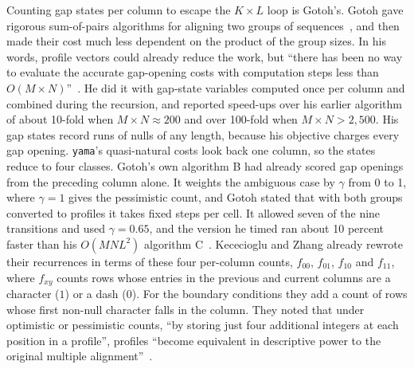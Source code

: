 \documentclass[11pt,letterpaper]{article}
\newcommand{\code}[1]{\texttt{#1}}
\begin{document}
Counting gap states per column to escape the $K \times L$ loop is Gotoh's. Gotoh gave rigorous sum-of-pairs algorithms
for aligning two groups of sequences~\cite{gotoh1993}, and then made their cost much less dependent on the product
of the group sizes. In his words, profile vectors could already reduce the work, but ``there has been no way to
evaluate the accurate gap-opening costs with computation steps less than $O(M \times N)$''~\cite{gotoh1994}. He did
it with gap-state variables computed once per column and combined during the recursion, and reported speed-ups over his
earlier algorithm of about 10-fold when $M \times N \approx 200$ and over 100-fold when $M \times N > 2{,}500$. His gap
states record runs of nulls of any length, because his objective charges every gap opening. \code{yama}'s quasi-natural costs look back one column,
so the states reduce to four classes. Gotoh's own algorithm B had already scored gap openings from the preceding column
alone. It weights the ambiguous case by $\gamma$ from 0 to 1, where $\gamma = 1$ gives the pessimistic count, and Gotoh
stated that with both groups converted to profiles it takes fixed steps per cell. It allowed seven of the nine transitions and
used $\gamma = 0.65$, and the version he timed ran about 10 percent faster than his $O(MNL^2)$ algorithm
C~\cite{gotoh1993}. Kececioglu and Zhang already rewrote their recurrences in terms of these four per-column
counts, $f_{00}$, $f_{01}$, $f_{10}$ and $f_{11}$, where $f_{xy}$ counts rows whose entries in the previous and
current columns are a character ($1$) or a dash ($0$). For the boundary conditions they add a count of rows whose
first non-null character falls in the column. They noted that under optimistic or pessimistic counts, ``by storing just four
additional integers at each position in a profile'', profiles ``become equivalent in descriptive power to the
original multiple alignment''~\cite{kececioglu1998}.
\end{document}

